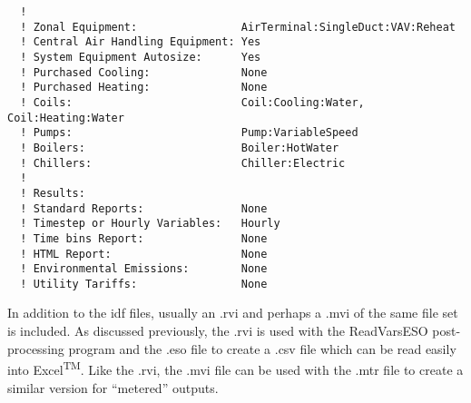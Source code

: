 \begin{lstlisting}
  !
  ! Zonal Equipment:                AirTerminal:SingleDuct:VAV:Reheat
  ! Central Air Handling Equipment: Yes
  ! System Equipment Autosize:      Yes
  ! Purchased Cooling:              None
  ! Purchased Heating:              None
  ! Coils:                          Coil:Cooling:Water, Coil:Heating:Water
  ! Pumps:                          Pump:VariableSpeed
  ! Boilers:                        Boiler:HotWater
  ! Chillers:                       Chiller:Electric
  !
  ! Results:
  ! Standard Reports:               None
  ! Timestep or Hourly Variables:   Hourly
  ! Time bins Report:               None
  ! HTML Report:                    None
  ! Environmental Emissions:        None
  ! Utility Tariffs:                None
\end{lstlisting}

In addition to the idf files, usually an .rvi and perhaps a .mvi of the same file set is included. As discussed previously, the .rvi is used with the ReadVarsESO post-processing program and the .eso file to create a .csv file which can be read easily into Excel\textsuperscript{TM}. Like the .rvi, the .mvi file can be used with the .mtr file to create a similar version for ``metered'' outputs.
